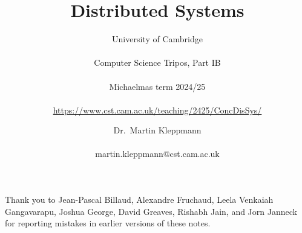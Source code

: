 \newcommand{\coursepath}{/teaching/2425/ConcDisSys/}
\newcommand{\courseurl}{\url{https://www.cst.cam.ac.uk\coursepath}}
\newcommand{\thisyear}{2024/25}
\newcommand{\timestampexample}{2021-11-09T09:50:17+00:00}
\newcommand{\whenissecurity}{Part IB Easter term}
\newcommand{\whenisnetworking}{Part IB Lent term}
\newcommand{\networking}{https://www.cl.cam.ac.uk/teaching/2425/CompNet/}
\newcommand{\security}{https://www.cl.cam.ac.uk/teaching/2425/CySecurity/}
\newcommand{\ledgersystems}{https://www.cl.cam.ac.uk/teaching/2425/R47/}
\newcommand{\multicore}{https://www.cl.cam.ac.uk/teaching/2425/L304/}

\newcommand{\mydetails}{%
    Dr.\ Martin Kleppmann\\\\
    martin.kleppmann@cst.cam.ac.uk\\\\[1em]
    University of Cambridge\\\\
    Computer Science Tripos, Part IB%
}



\title{Distributed Systems}
\subtitle{University of Cambridge\\\\%
Computer Science Tripos, Part IB\\\\%
Michaelmas term \thisyear\\\\%
\courseurl}

\author{Dr.\ Martin Kleppmann\\\\martin.kleppmann@cst.cam.ac.uk}
\date{}
\maketitle
\tableofcontents

\vspace{10pt}\noindent Thank you to Jean-Pascal Billaud, Alexandre Fruchaud, Leela Venkaiah Gangavarapu, Joshua George, David Greaves, Rishabh Jain, and Jorn Janneck for reporting mistakes in earlier versions of these notes.

\def\sectionautorefname{Section}%
\def\subsectionautorefname{Section}%
\def\subsubsectionautorefname{Section}%


\footnotesize

{}

